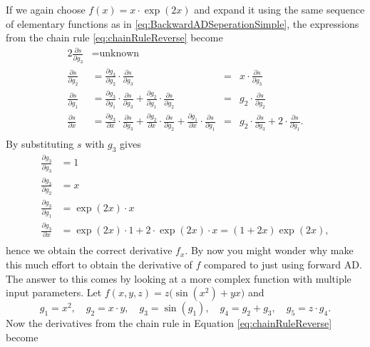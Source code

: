 If we again choose  $f(x) = x\cdot\exp(2x)$ and expand it using the same sequence of elementary functions as in \eqref{eq:BackwardADSeperationSimple}, the expressions from the chain rule \eqref{eq:chainRuleReverse} become
\begin{alignat*}{2}
    \frac{\partial s}{\partial g_3} &= \text{unknown}\\
    \frac{\partial s}{\partial g_2} &= \frac{\partial g_3}{\partial g_2} \cdot \frac{\partial s}{\partial g_3} &=& x\cdot \frac{\partial s}{\partial g_3} \\
    \frac{\partial s}{\partial g_1} &= \frac{\partial g_3}{\partial g_1}\cdot \frac{\partial s}{\partial g_3} + \frac{\partial g_2}{\partial g_1}\cdot \frac{\partial s}{\partial g_2} &=& g_2 \cdot \frac{\partial s}{\partial g_2} \\
    \frac{\partial s}{\partial x} &= \frac{\partial g_3}{\partial x}\cdot \frac{\partial s}{\partial g_3} + \frac{\partial g_2}{\partial x}\cdot \frac{\partial s}{\partial g_2} + \frac{\partial g_1}{\partial x}\cdot \frac{\partial s}{\partial g_1} &=& g_2\cdot \frac{\partial s}{\partial g_3} + 2\cdot \frac{\partial s}{\partial g_1}.\\
\end{alignat*}
By substituting $s$ with $g_3$ gives
\begin{align*}
    \frac{\partial g_3}{\partial g_3} &= 1\\
    \frac{\partial g_3}{\partial g_2} &= x\\
    \frac{\partial g_3}{\partial g_1} &= \exp(2x)\cdot x\\
    \frac{\partial g_3}{\partial x} &= \exp(2x)\cdot 1 + 2\cdot\exp(2x)\cdot x = (1 + 2x)\exp(2x),\\
\end{align*}
hence we obtain the correct derivative $f_x$. By now you might wonder why make this much effort to obtain the derivative of $f$ compared to just using forward AD. The answer to this comes by looking at a more complex function with multiple input parameters. Let $f(x,y,z) = z\bigl(\sin(x^2)+yx\bigr)$ and 
\begin{equation}
    g_1 = x^2, \quad g_2 = x\cdot y, \quad g_3 = \sin(g_1), \quad g_4 = g_2 + g_3, \quad g_5 = z\cdot g_4.
    \label{eq:DependencyBackwardAD}
\end{equation}
Now the derivatives from the chain rule in Equation \eqref{eq:chainRuleReverse} become%
